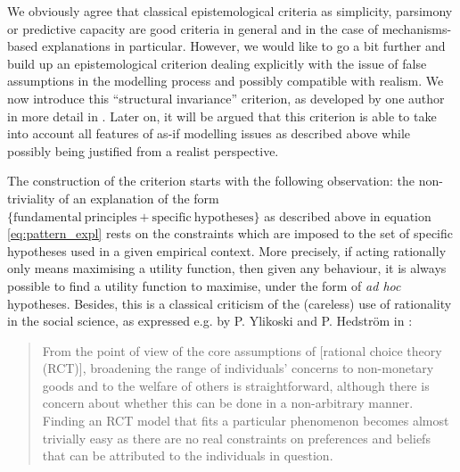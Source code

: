 \documentclass[a4paper,11pt]{article}
\theoremstyle{definition}
\begin{document}
We obviously agree that classical epistemological criteria as simplicity, parsimony or predictive capacity are good criteria in general and in the case of mechanisms-based explanations in particular. However, we would like to go a bit further and build up an epistemological criterion dealing explicitly with the issue of false assumptions in the modelling process and possibly compatible with realism. We now introduce this ``structural invariance'' criterion, as developed by one author in more detail in \citep{attard_rationality}. Later on, it will be argued that this criterion is able to take into account all features of as-if modelling issues as described above while possibly being justified from a realist perspective.

The construction of the criterion starts with the following observation: the non-triviality of an explanation of the form $\{\mathrm{fundamental~principles + specific~hypotheses}\}$ as described above in equation \eqref{eq:pattern_expl} rests on the constraints which are imposed to the set of specific hypotheses used in a given empirical context. More precisely, if acting rationally only means maximising a utility function, then given any behaviour, it is always possible to find a utility function to maximise, under the form of \textit{ad hoc} hypotheses. Besides, this is a classical criticism of the (careless) use of rationality in the social science, as expressed e.g. by P. Ylikoski and P. Hedström in \citep[Chapter~2,~pp.~59-60]{Manzo2014}:

\begin{quote}
From the point of view of the core assumptions of [rational choice theory (RCT)], broadening the range of individuals’ concerns to non-monetary goods and to the welfare of others is straightforward, although there is concern about whether this can be done in a non-arbitrary manner. \textelp{} Finding an RCT model that fits a particular phenomenon becomes almost trivially easy as there are no real constraints on preferences and beliefs that can be attributed to the individuals in question.
\end{quote}
\end{document}
